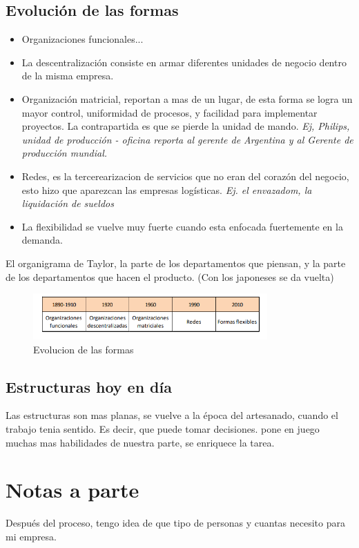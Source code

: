 \documentclass[titlepage,a4paper]{article}
\begin{document}
\subsection{Evolución de las formas}
\begin{itemize}
    \item Organizaciones funcionales...
    \item La descentralización consiste en armar diferentes unidades de negocio dentro de la misma empresa.
    \item Organización matricial, reportan a mas de un lugar, de esta forma se logra un mayor control, uniformidad de procesos, y facilidad para implementar proyectos. La contrapartida es que se pierde la unidad de mando. \textit{Ej, Philips, unidad de producción - oficina reporta al gerente de Argentina y al Gerente de producción mundial.}
    \item Redes, es la tercerearizacion de servicios que no eran del corazón del negocio, esto hizo que aparezcan las empresas logísticas. \textit{Ej. el envazadom, la liquidación de sueldos}
    \item La flexibilidad se vuelve muy fuerte cuando esta enfocada fuertemente en la demanda.
\end{itemize}

El organigrama de Taylor, la parte de los departamentos que piensan, y la parte de los departamentos que hacen el producto. (Con los japoneses se da vuelta)

\begin{figure}[!htb]
    \centering
    \includegraphics[width=0.8\textwidth]{imagenes/EvolucionFormas.PNG}
    \caption{Evolucion de las formas}
\end{figure}


\subsection{Estructuras hoy en día}
Las estructuras son mas planas, se vuelve a la época del artesanado, cuando el trabajo tenia sentido. Es decir, que puede tomar decisiones. pone en juego muchas mas habilidades de nuestra parte, se enriquece la tarea.


\section*{Notas a parte}
Después del proceso, tengo idea de que tipo de personas y cuantas necesito para mi empresa.
\end{document}
